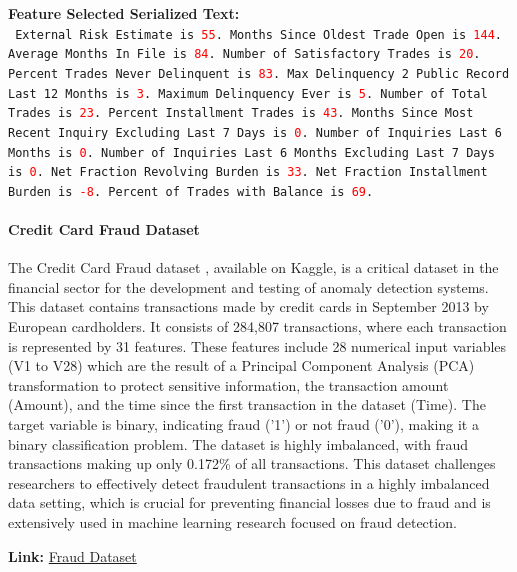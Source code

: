 \documentclass{article}
\theoremstyle{plain}
\theoremstyle{definition}
\theoremstyle{remark}
\begin{document}
\begin{mdframed}
\textbf{Feature Selected Serialized Text:}\\
\texttt{%
External Risk Estimate is \textcolor{red}{55}. 
Months Since Oldest Trade Open is \textcolor{red}{144}. 
Average Months In File is \textcolor{red}{84}. 
Number of Satisfactory Trades is \textcolor{red}{20}. 
Percent Trades Never Delinquent is \textcolor{red}{83}. 
Max Delinquency 2 Public Record Last 12 Months is \textcolor{red}{3}. 
Maximum Delinquency Ever is \textcolor{red}{5}. 
Number of Total Trades is \textcolor{red}{23}. 
Percent Installment Trades is \textcolor{red}{43}. 
Months Since Most Recent Inquiry Excluding Last 7 Days is \textcolor{red}{0}. 
Number of Inquiries Last 6 Months is \textcolor{red}{0}. 
Number of Inquiries Last 6 Months Excluding Last 7 Days is \textcolor{red}{0}. 
Net Fraction Revolving Burden is \textcolor{red}{33}. 
Net Fraction Installment Burden is \textcolor{red}{-8}. 
Percent of Trades with Balance is \textcolor{red}{69}.
}
\end{mdframed}

\newpage

\paragraph{Credit Card Fraud Dataset} The Credit Card Fraud dataset \cite{dal2014learned, dal2017credit, dal2015calibrating}, available on Kaggle, is a critical dataset in the financial sector for the development and testing of anomaly detection systems. This dataset contains transactions made by credit cards in September 2013 by European cardholders. It consists of 284,807 transactions, where each transaction is represented by 31 features. These features include 28 numerical input variables (V1 to V28) which are the result of a Principal Component Analysis (PCA) transformation to protect sensitive information, the transaction amount (Amount), and the time since the first transaction in the dataset (Time). The target variable is binary, indicating fraud ('1') or not fraud ('0'), making it a binary classification problem. The dataset is highly imbalanced, with fraud transactions making up only 0.172\% of all transactions. This dataset challenges researchers to effectively detect fraudulent transactions in a highly imbalanced data setting, which is crucial for preventing financial losses due to fraud and is extensively used in machine learning research focused on fraud detection.

\textbf{Link: }\href{https://www.kaggle.com/datasets/mlg-ulb/creditcardfraud/data}{Fraud Dataset}
\end{document}
